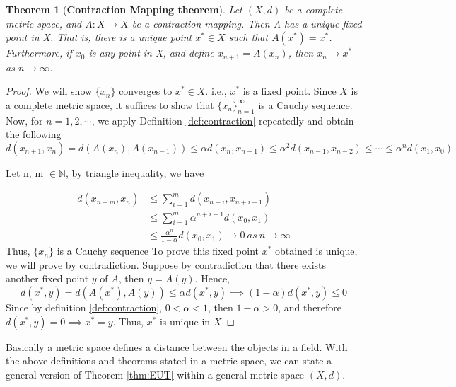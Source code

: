 \documentclass{article}
\newtheorem{theorem}{Theorem}[section]
\theoremstyle{definition}
\theoremstyle{remark}
\theoremstyle{example}
\begin{document}
\begin{theorem}[\textbf{Contraction Mapping theorem}]\cite{holmes_chapter_2016}\label{thm:CMT}
    Let $(X,d)$ be a complete metric space, and $A:X\rightarrow X$ be a contraction mapping. Then A has a unique fixed point in X. That is, there is a unique point $x^*\in X$ such that $A(x^*) = x^*$. Furthermore, if $x_0$ is any point in X, and define $x_{n+1} = A(x_n)$, then $x_n \rightarrow x^*$ as $n \rightarrow \infty$.
\end{theorem}

\begin{proof}

    We will show $\{x_n\}$ converges to $x^* \in X$. i.e., $x^*$ is a fixed point. Since $X$ is a complete metric space, it suffices to show that $\{x_n\}_{n = 1}^{\infty}$ is a Cauchy sequence. Now, for $n = 1,2, \cdots$, we apply Definition \ref{def:contraction} repeatedly and obtain the following
        \begin{equation}
            d(x_{n+1},x_n) = d(A(x_n),A(x_{n-1})) \leq \alpha d(x_n,x_{n-1}) \leq \alpha^2 d(x_{n-1},x_{n-2}) \leq \cdots \leq \alpha^n d(x_1,x_0)
        \end{equation}
        
    Let n, m $\in \mathbb{N}$, by triangle inequality, we have
    
        \begin{align}
            d(x_{n+m},x_n) &\leq \sum_{i=1}^{m} d(x_{n+i},x_{n+i-1})\\
            &\leq \sum_{i=1}^{m} \alpha^{n+i-1} d(x_0,x_1)\\
            &\leq \frac{\alpha^n}{1-\alpha}d(x_0,x_1) \rightarrow 0  \ as\ n \rightarrow \infty
        \end{align}
    Thus, $\{x_n\}$ is a Cauchy sequence
    To prove this fixed point $x^{*}$ obtained is unique, we will prove by contradiction. Suppose by contradiction that there exists another fixed point $y$ of $A$, then $y = A(y)$. Hence,
    \begin{equation}
        d(x^{*},y) = d(A(x^{*}),A(y)) \leq \alpha d(x^{*},y) \implies (1-\alpha)d(x^{*},y) \leq 0
    \end{equation}
    Since by definition \ref{def:contraction}, $0 < \alpha < 1$, then $1-\alpha > 0$, and therefore $d(x^{*},y) = 0 \implies x^{*} = y$. Thus, $x^{*}$ is unique in $X$
\end{proof}

Basically a metric space defines a distance between the objects in a field. With the above definitions and theorems stated in a metric space, we can state a general version of Theorem \ref{thm:EUT} within a general metric space $(X,d)$. 
\end{document}
